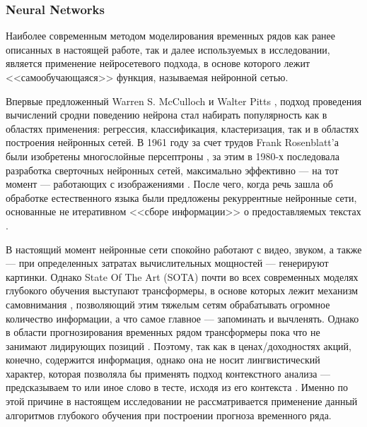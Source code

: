 \subsubsection{Neural Networks} \label{link::neural_networks}
Наиболее современным методом моделирования временных рядов как ранее описанных в настоящей работе, так и далее используемых в исследовании, является применение нейросетевого подхода, в основе которого лежит <<самообучающаяся>> функция, называемая нейронной сетью. 

Впервые предложенный Warren S. McCulloch и Walter Pitts \cite{mcculloch1943logical}, подход проведения вычислений сродни поведению нейрона стал набирать популярность как в областях применения: регрессия, классификация, кластеризация, так и в областях построения нейронных сетей. В 1961 году за счет трудов Frank Rosenblatt'а были изобретены многослойные персептроны \cite{rosenblatt1961principles}, за этим в 1980-х последовала разработка сверточных нейронных сетей, максимально эффективно --- на тот момент --- работающих с изображениями \cite{lecun1989backpropagation, lecun2015deep, lecun1989generalization}. После чего, когда речь зашла об обработке естественного языка были предложены рекуррентные нейронные сети, основанные не итеративном <<сборе информации>> о предоставляемых текстах \cite{hochreiter1997long, rumelhart1986learning}. 

В настоящий момент нейронные сети спокойно работают с видео, звуком, а также --- при определенных затратах вычислительных мощностей --- генерируют картинки. Однако State Of The Art (SOTA) почти во всех современных моделях глубокого обучения выступают трансформеры, в основе которых лежит механизм самовнимания \cite{attention_transformers}, позволяющий этим тяжелым сетям обрабатывать огромное количество информации, а что самое главное --- запоминать и вычленять. Однако в области прогнозирования временных рядом трансформеры пока что не занимают лидирующих позиций \cite{transformers_are_useless_for_TSF}.  Поэтому, так как в ценах/доходностях акций, конечно, содержится информация, однако она не носит лингвистический характер, которая позволяла бы применять подход контекстного анализа --- предсказываем то или иное слово в тесте, исходя из его контекста \cite{word2vec_2013}. Именно по этой причине в настоящем исследовании не рассматривается применение данный алгоритмов глубокого обучения при построении прогноза временного ряда.




